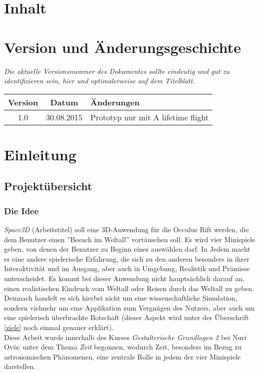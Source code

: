 \documentclass{Ausarbeitung}
\begin{document}
\maketitle


\section*{Inhalt}
\tableofcontents
\clearpage
\section*{Version und Änderungsgeschichte}

	{\em Die aktuelle Versionsnummer des Dokumentes sollte eindeutig und gut zu
	identifizieren sein, hier und optimalerweise auf dem Titelblatt.}

	\begin{tabular}{ccl}
		Version & Datum & Änderungen \\
		\hline
		1.0 & 30.08.2015 & Prototyp nur mit A lifetime flight \\
	\end{tabular}
\clearpage
\section{Einleitung}
\label{intro}
	\subsection{Projektübersicht}\label{ubersicht}
		\subsubsection{Die Idee}\label{idee}
			\textit{Space3D} (Arbeitstitel) soll eine 3D-Anwendung für die Occulus Rift werden, die dem Benutzer einen ''Besuch im Weltall'' vortäuschen soll. Es wird vier Minispiele geben, von denen der Benutzer zu Beginn eines auswählen darf. In Jedem macht er eine andere spielerische Erfahrung, die sich zu den anderen besonders in ihrer Interaktivität und im Ausgang, aber auch in Umgebung, Realistik und Prämisse unterscheidet. Es kommt bei dieser Anwendung nicht hauptsächlich darauf an, einen realistischen Eindruck vom Weltall oder Reisen durch das Weltall zu geben. Demnach handelt es sich hierbei nicht um eine wissenschaftliche Simulation, sondern vielmehr um eine Applikation zum Vergnügen des Nutzers, aber auch um eine spielerisch überbrachte Botschaft (dieser Aspekt wird unter der Überschrift \ref{ziele} noch einmal genauer erklärt). \\
			Diese Arbeit wurde innerhalb des Kurses \textit{Gestalterische Grundlagen 2} bei Nuri Ovüc unter dem Thema \textit{Zeit} begonnen, wodurch Zeit, besonders im Bezug zu astronomischen Phänomenen, eine zentrale Rolle in jedem der  vier Minispiele darstellen.
\end{document}
